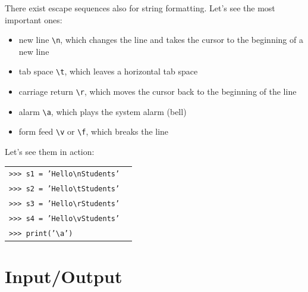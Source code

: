\documentclass[t,handout,9pt]{beamer}
\begin{document}
\begin{frame}
\vfill
There exist escape sequences also for string formatting.
\vfill
Let's see the most important ones:
\begin{itemize}
	\item new line \texttt{\textbackslash n}, which changes the line and takes the cursor to the beginning of a new line
	\item tab space \texttt{\textbackslash t}, which leaves a horizontal tab space
	\item carriage return \texttt{\textbackslash r}, which moves the cursor back to the beginning of the line
	\item alarm \texttt{\textbackslash a}, which plays the system alarm (bell)
	\item form feed \texttt{\textbackslash v} or \texttt{\textbackslash f}, which breaks the line
\end{itemize}
\vfill
Let's see them in action:
\begin{table}[]
\begin{tabular}{ll}
\texttt{>{}>{}> s1 = 'Hello\textbackslash nStudents'} & \\
\texttt{>{}>{}> s2 = 'Hello\textbackslash tStudents'} & \\
\texttt{>{}>{}> s3 = 'Hello\textbackslash rStudents'} & \\
\texttt{>{}>{}> s4 = 'Hello\textbackslash vStudents'} & \\
\texttt{>{}>{}> print('\textbackslash a')} & \\
\end{tabular}
\end{table}
\vfill
\end{frame}
\section{Input/Output}
\end{document}
